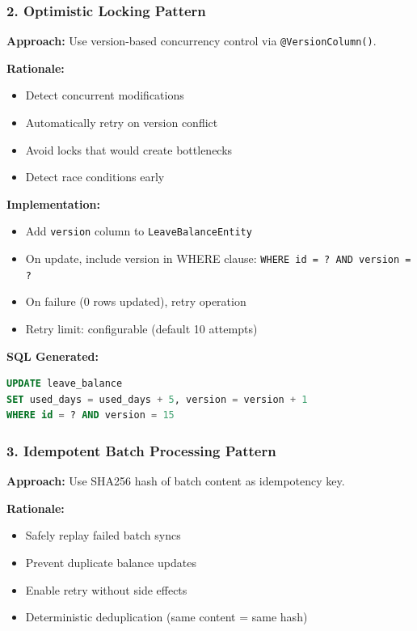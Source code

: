 \documentclass[12pt,a4paper]{article}
\begin{document}
\subsubsection{2. Optimistic Locking Pattern}

\textbf{Approach:} Use version-based concurrency control via \texttt{@VersionColumn()}.

\textbf{Rationale:}
\begin{itemize}
    \item Detect concurrent modifications
    \item Automatically retry on version conflict
    \item Avoid locks that would create bottlenecks
    \item Detect race conditions early
\end{itemize}

\textbf{Implementation:}
\begin{itemize}
    \item Add \texttt{version} column to \texttt{LeaveBalanceEntity}
    \item On update, include version in WHERE clause: \texttt{WHERE id = ? AND version = ?}
    \item On failure (0 rows updated), retry operation
    \item Retry limit: configurable (default 10 attempts)
\end{itemize}

\textbf{SQL Generated:}
\begin{lstlisting}[language=SQL]
UPDATE leave_balance 
SET used_days = used_days + 5, version = version + 1
WHERE id = ? AND version = 15
\end{lstlisting}

\subsubsection{3. Idempotent Batch Processing Pattern}

\textbf{Approach:} Use SHA256 hash of batch content as idempotency key.

\textbf{Rationale:}
\begin{itemize}
    \item Safely replay failed batch syncs
    \item Prevent duplicate balance updates
    \item Enable retry without side effects
    \item Deterministic deduplication (same content = same hash)
\end{itemize}
\end{document}
